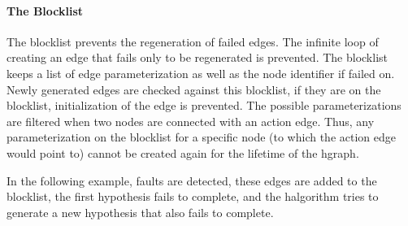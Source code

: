 \paragraph{The Blocklist}%
The blocklist prevents the regeneration of failed edges. The infinite loop of creating an edge that fails only to be regenerated is prevented. The blocklist keeps a list of edge parameterization as well as the node identifier if failed on. Newly generated edges are checked against this blocklist, if they are on the blocklist, initialization of the edge is prevented. The possible parameterizations are filtered when two nodes are connected with an action edge. Thus, any parameterization on the blocklist for a specific node (to which the action edge would point to) cannot be created again for the lifetime of the \ac{hgraph}.\bs

In the following example,  faults are detected, these edges are added to the blocklist, the first hypothesis fails to complete, and the \ac{halgorithm} tries to generate a new hypothesis that also fails to complete.\bs

